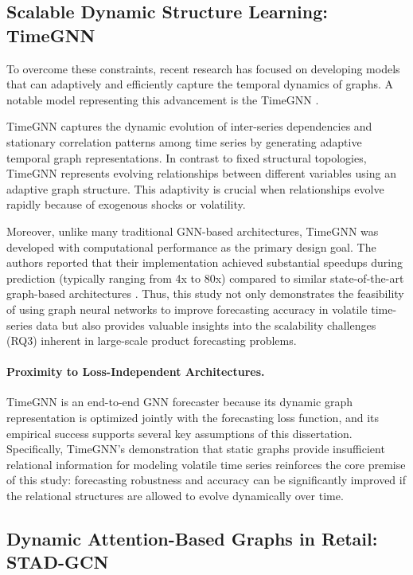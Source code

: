 \subsection{Scalable Dynamic Structure Learning: TimeGNN}
\label{sec:pathb-timegnn}
To overcome these constraints, recent research has focused on developing models that can adaptively and efficiently capture the temporal dynamics of graphs. A notable model representing this advancement is the TimeGNN \cite{xu2024timegnn}.

TimeGNN captures the dynamic evolution of inter-series dependencies and stationary correlation patterns among time series by generating adaptive temporal graph representations. In contrast to fixed structural topologies, TimeGNN represents evolving relationships between different variables using an adaptive graph structure. This adaptivity is crucial when relationships evolve rapidly because of exogenous shocks or volatility.

Moreover, unlike many traditional GNN-based architectures, TimeGNN was developed with computational performance as the primary design goal. The authors reported that their implementation achieved substantial speedups during prediction (typically ranging from 4x to 80x) compared to similar state-of-the-art graph-based architectures \cite{xu2024timegnn}. Thus, this study not only demonstrates the feasibility of using graph neural networks to improve forecasting accuracy in volatile time-series data but also provides valuable insights into the scalability challenges (RQ3) inherent in large-scale product forecasting problems.

\paragraph{Proximity to Loss-Independent Architectures.}
TimeGNN is an end-to-end GNN forecaster because its dynamic graph representation is optimized jointly with the forecasting loss function, and its empirical success supports several key assumptions of this dissertation. Specifically, TimeGNN's demonstration that static graphs provide insufficient relational information for modeling volatile time series reinforces the core premise of this study: forecasting robustness and accuracy can be significantly improved if the relational structures are allowed to evolve dynamically over time.
\subsection{Dynamic Attention-Based Graphs in Retail: STAD-GCN}
\label{sec:pathb-stadgcn}

